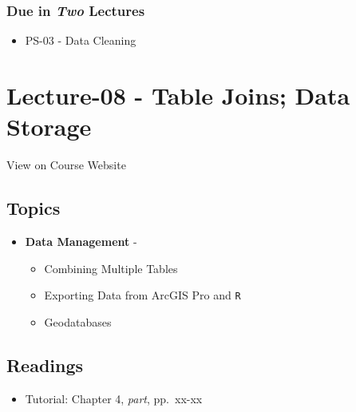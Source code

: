\documentclass[]{book}
\providecommand{\tightlist}{%
  \setlength{\itemsep}{0pt}\setlength{\parskip}{0pt}}
\begin{document}
\hypertarget{due-in-two-lectures-2}{%
\subsubsection*{\texorpdfstring{Due in \emph{Two} Lectures}{Due in Two Lectures}}\label{due-in-two-lectures-2}}

\begin{itemize}
\tightlist
\item
  PS-03 - Data Cleaning
\end{itemize}

\hypertarget{lecture-08---table-joins-data-storage}{%
\section*{Lecture-08 - Table Joins; Data Storage}\label{lecture-08---table-joins-data-storage}}

View on Course Website

\hypertarget{topics-8}{%
\subsection*{Topics}\label{topics-8}}

\begin{itemize}
\tightlist
\item
  \textbf{Data Management} -

  \begin{itemize}
  \tightlist
  \item
    Combining Multiple Tables
  \item
    Exporting Data from ArcGIS Pro and \texttt{R}
  \item
    Geodatabases
  \end{itemize}
\end{itemize}

\hypertarget{readings-9}{%
\subsection*{Readings}\label{readings-9}}

\begin{itemize}
\tightlist
\item
  Tutorial: Chapter 4, \emph{part}, pp.~xx-xx
\end{itemize}
\end{document}
